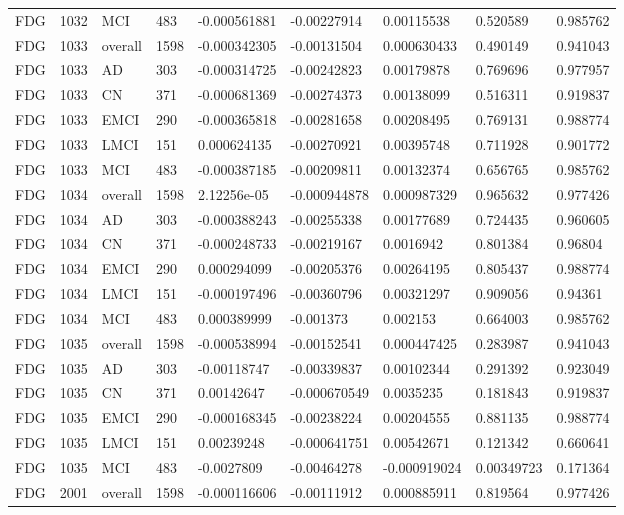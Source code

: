 \begin{landscape}
\begin{longtable}{lllllllll}
FDG & 1032 & MCI & 483 & -0.000561881 & -0.00227914 & 0.00115538 & 0.520589 & 0.985762 \\
FDG & 1033 & overall & 1598 & -0.000342305 & -0.00131504 & 0.000630433 & 0.490149 & 0.941043 \\
FDG & 1033 & AD & 303 & -0.000314725 & -0.00242823 & 0.00179878 & 0.769696 & 0.977957 \\
FDG & 1033 & CN & 371 & -0.000681369 & -0.00274373 & 0.00138099 & 0.516311 & 0.919837 \\
FDG & 1033 & EMCI & 290 & -0.000365818 & -0.00281658 & 0.00208495 & 0.769131 & 0.988774 \\
FDG & 1033 & LMCI & 151 & 0.000624135 & -0.00270921 & 0.00395748 & 0.711928 & 0.901772 \\
FDG & 1033 & MCI & 483 & -0.000387185 & -0.00209811 & 0.00132374 & 0.656765 & 0.985762 \\
FDG & 1034 & overall & 1598 & 2.12256e-05 & -0.000944878 & 0.000987329 & 0.965632 & 0.977426 \\
FDG & 1034 & AD & 303 & -0.000388243 & -0.00255338 & 0.00177689 & 0.724435 & 0.960605 \\
FDG & 1034 & CN & 371 & -0.000248733 & -0.00219167 & 0.0016942 & 0.801384 & 0.96804 \\
FDG & 1034 & EMCI & 290 & 0.000294099 & -0.00205376 & 0.00264195 & 0.805437 & 0.988774 \\
FDG & 1034 & LMCI & 151 & -0.000197496 & -0.00360796 & 0.00321297 & 0.909056 & 0.94361 \\
FDG & 1034 & MCI & 483 & 0.000389999 & -0.001373 & 0.002153 & 0.664003 & 0.985762 \\
FDG & 1035 & overall & 1598 & -0.000538994 & -0.00152541 & 0.000447425 & 0.283987 & 0.941043 \\
FDG & 1035 & AD & 303 & -0.00118747 & -0.00339837 & 0.00102344 & 0.291392 & 0.923049 \\
FDG & 1035 & CN & 371 & 0.00142647 & -0.000670549 & 0.0035235 & 0.181843 & 0.919837 \\
FDG & 1035 & EMCI & 290 & -0.000168345 & -0.00238224 & 0.00204555 & 0.881135 & 0.988774 \\
FDG & 1035 & LMCI & 151 & 0.00239248 & -0.000641751 & 0.00542671 & 0.121342 & 0.660641 \\
FDG & 1035 & MCI & 483 & -0.0027809 & -0.00464278 & -0.000919024 & 0.00349723 & 0.171364 \\
FDG & 2001 & overall & 1598 & -0.000116606 & -0.00111912 & 0.000885911 & 0.819564 & 0.977426 \\

\end{longtable}
\end{landscape}
